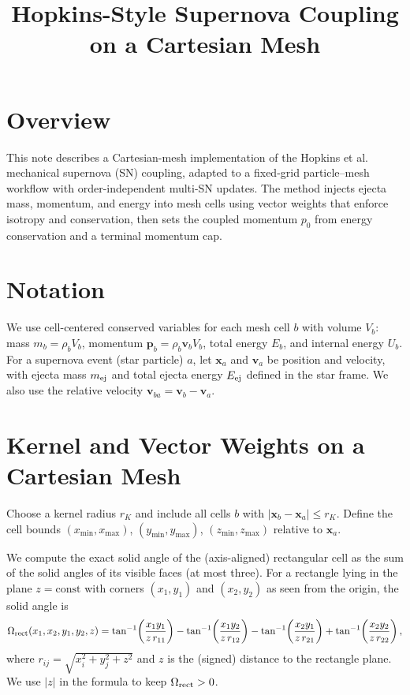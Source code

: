 \documentclass[11pt]{article}
\title{Hopkins-Style Supernova Coupling on a Cartesian Mesh}
\author{}
\date{}
\begin{document}
\maketitle

\section{Overview}
This note describes a Cartesian-mesh implementation of the Hopkins et al. mechanical
supernova (SN) coupling, adapted to a fixed-grid particle--mesh workflow with
order-independent multi-SN updates. The method injects ejecta mass, momentum, and
energy into mesh cells using vector weights that enforce isotropy and conservation,
then sets the coupled momentum $p_{0}$ from energy conservation and a terminal
momentum cap.

\section{Notation}
We use cell-centered conserved variables for each mesh cell $b$ with volume $V_{b}$:
mass $m_{b}=\rho_{b}V_{b}$, momentum $\mathbf p_{b}=\rho_{b}\mathbf v_{b}V_{b}$, total
energy $E_{b}$, and internal energy $U_{b}$. For a supernova event (star particle) $a$,
let $\mathbf x_{a}$ and $\mathbf v_{a}$ be position and velocity, with ejecta mass
$m_{\rm ej}$ and total ejecta energy $E_{\rm ej}$ defined in the star frame. We also
use the relative velocity $\mathbf v_{ba}=\mathbf v_{b}-\mathbf v_{a}$.

\section{Kernel and Vector Weights on a Cartesian Mesh}
Choose a kernel radius $r_{K}$ and include all cells $b$ with
$|\mathbf x_{b}-\mathbf x_{a}| \le r_{K}$. Define the cell bounds
$(x_{\min},x_{\max})$, $(y_{\min},y_{\max})$, $(z_{\min},z_{\max})$
relative to $\mathbf x_{a}$.

We compute the exact solid angle of the (axis-aligned) rectangular cell as the
sum of the solid angles of its visible faces (at most three). For a rectangle
lying in the plane $z=\text{const}$ with corners $(x_{1},y_{1})$ and $(x_{2},y_{2})$
as seen from the origin, the solid angle is
\begin{equation}
\Omega_{\rm rect}(x_{1},x_{2},y_{1},y_{2},z) =
\tan^{-1}\!\left(\frac{x_{1}y_{1}}{z\,r_{11}}\right)
- \tan^{-1}\!\left(\frac{x_{1}y_{2}}{z\,r_{12}}\right)
- \tan^{-1}\!\left(\frac{x_{2}y_{1}}{z\,r_{21}}\right)
+ \tan^{-1}\!\left(\frac{x_{2}y_{2}}{z\,r_{22}}\right),
\end{equation}
where $r_{ij}=\sqrt{x_{i}^{2}+y_{j}^{2}+z^{2}}$ and $z$ is the (signed) distance
to the rectangle plane. We use $|z|$ in the formula to keep $\Omega_{\rm rect}>0$.
\end{document}
